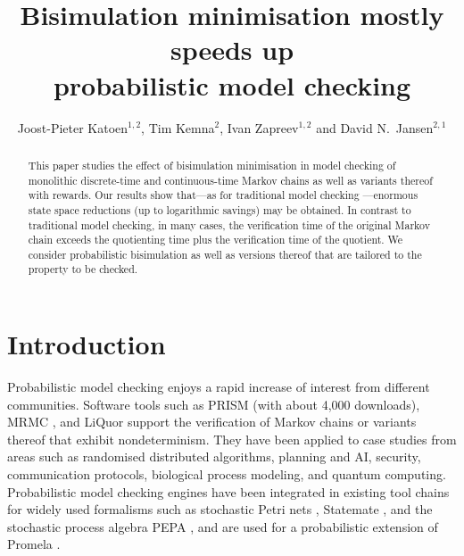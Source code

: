 \documentclass{llncs}
\begin{document}
	
	

\title{Bisimulation minimisation mostly speeds up \\ probabilistic model checking}


\author{Joost-Pieter Katoen$^{1,2}$, Tim Kemna$^2$, Ivan Zapreev$^{1,2}$ 
and David N.\ Jansen$^{2,1}$}

\maketitle
%
\begin{abstract}
This paper studies the effect of bisimulation minimisation in model checking of 
monolithic discrete-time and continuous-time Markov chains as well as variants 
thereof with rewards.  Our results show that---as for traditional model checking%
---enormous state space reductions (up to logarithmic savings) may be obtained.  
In contrast to traditional model checking, in many cases, the verification time of
the original Markov chain exceeds the quotienting time plus the verification time
of the quotient.  We consider probabilistic bisimulation as well as versions thereof
that are tailored to the property to be checked.
\end{abstract}

\section{Introduction}

Probabilistic model checking  enjoys a rapid increase of interest from different communities.  
Software tools such as PRISM \cite{HintonKNP_TACAS06} (with about 4,000 downloads),  MRMC \cite{KatoenKZ_QEST05}, and 
LiQuor \cite{BaierCG_SIGMETRICS05} 
support the verification of Markov chains or variants thereof that exhibit 
nondeterminism.
They have been applied to case studies from areas such as randomised distributed algorithms, 
planning and AI, security, communication protocols, biological process modeling, and quantum
computing.
Probabilistic model checking engines have been integrated in existing tool chains for widely
used formalisms such as stochastic Petri nets \cite{DAprileDS_DS04}, Statemate \cite{BodeHHJPPWB_QEST06}, and 
the stochastic process algebra PEPA \cite{Hillston_96}, and are used for a probabilistic extension of 
Promela \cite{BaierCG_SIGMETRICS05}. 
\end{document}
